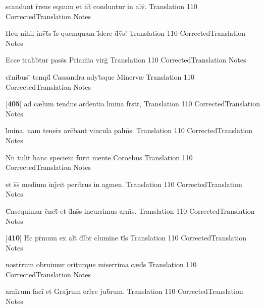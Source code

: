 \latline
  {scandunt r\={}rsus equum et n\={}t\={} conduntur in alv\={}.}
  { Translation }
  {110}
  { CorrectedTranslation }
  { Notes }


\latline
  {Heu nihil inv\={\macron {\i}}t\={\macron {\i}}s f\={}s quemquam f\={\macron {\i}}dere d\={\macron {\i}}v\={\macron {\i}}s!}
  { Translation }
  {110}
  { CorrectedTranslation }
  { Notes }


\latline
  {Ecce trah\={}b\={}tur pass\={\macron {\i}}s Priam\={}ia virg\={}}
  { Translation }
  {110}
  { CorrectedTranslation }
  { Notes }


\latline
  {cr\={\macron {\i}}nibus \={} templ\={} Cassandra adyt\={\macron {\i}}sque Minerv{\ae}}
  { Translation }
  {110}
  { CorrectedTranslation }
  { Notes }


\latline
  {[\textbf{405}] ad c{\ae}lum tend\={}ns ardentia l\={}mina fr\={}str\={},}
  { Translation }
  {110}
  { CorrectedTranslation }
  { Notes }


\latline
  {l\={}mina, nam tener\={}s arc\={}bant vincula palm\={}s.}
  { Translation }
  {110}
  { CorrectedTranslation }
  { Notes }


\latline
  {N\={}n tulit hanc speciem furi\={}t\={} mente Coroebus}
  { Translation }
  {110}
  { CorrectedTranslation }
  { Notes }


\latline
  {et s\={}s\={} medium inj\={}cit perit\={}rus in agmen.}
  { Translation }
  {110}
  { CorrectedTranslation }
  { Notes }


\latline
  {C\={}nsequimur c\={}nct\={\macron {\i}} et d\={}ns\={\macron {\i}}s incurrimus arm\={\macron {\i}}s.}
  { Translation }
  {110}
  { CorrectedTranslation }
  { Notes }


\latline
  {[\textbf{410}] H\={\macron {\i}}c pr\={\macron {\i}}mum ex alt\={} d\={}l\={}br\={\macron {\i}} clumine t\={}l\={\macron {\i}}s}
  { Translation }
  {110}
  { CorrectedTranslation }
  { Notes }


\latline
  {nostr\={}rum obruimur oriturque miserrima c{\ae}d\={}s}
  { Translation }
  {110}
  { CorrectedTranslation }
  { Notes }


\latline
  {arm\={}rum faci\={} et Graj\={}rum err\={}re jub\={}rum.}
  { Translation }
  {110}
  { CorrectedTranslation }
  { Notes }


